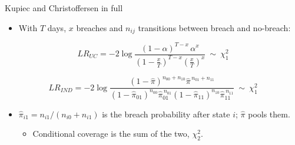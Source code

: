 \documentclass[9pt, aspectratio=169, t]{beamer}
\begin{document}
\begin{frame}{Kupiec and Christoffersen in full}
  \hypertarget{ap:tests}{}%
  \hfill\hyperlink{main:backtest}{}\par\vspace{-0.6em}
  \begin{itemize}
    \item With $T$ days, $x$ breaches and $n_{ij}$ transitions between breach and
          no-breach:
  \end{itemize}
  \begin{defn}
    \vspace{-0.6em}
    \[ LR_{UC} = -2\log\frac{(1-\alpha)^{T-x}\,\alpha^{x}}
       {\left(1-\tfrac{x}{T}\right)^{T-x}\left(\tfrac{x}{T}\right)^{x}}
       \ \sim\ \chi^{2}_{1} \]
    \vspace{-0.4em}
    \hfill{\scriptsize\parencite{kupiec1995}}
  \end{defn}
  \begin{defn}[Independence]
    \vspace{-0.6em}
    \[ LR_{IND} = -2\log\frac{(1-\hat\pi)^{n_{00}+n_{10}}\hat\pi^{\,n_{01}+n_{11}}}
       {(1-\hat\pi_{01})^{n_{00}}\hat\pi_{01}^{\,n_{01}}
        (1-\hat\pi_{11})^{n_{10}}\hat\pi_{11}^{\,n_{11}}}
       \ \sim\ \chi^{2}_{1} \]
    \vspace{-0.4em}
    \hfill{\scriptsize\parencite{christoffersen1998}}
  \end{defn}
  \vspace{0.2em}
  \begin{itemize}
    \item $\hat\pi_{i1} = n_{i1}/(n_{i0}+n_{i1})$ is the breach probability after state
          $i$; $\hat\pi$ pools them.
      \begin{itemize}
        \item Conditional coverage is the sum of the two, $\chi^{2}_{2}$.
      \end{itemize}
  \end{itemize}
\end{frame}
\end{document}

